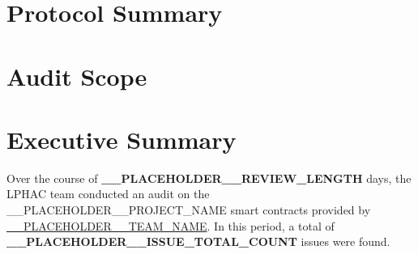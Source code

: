 \newcommand{\truncatehash}[1]{%
  \StrLeft{#1}{12}\ldots%
}

\hypertarget{protocol-summary}{%
\section{Protocol Summary}\label{protocol-summary}}



\hypertarget{audit-scope}{%
\section{Audit Scope}\label{audit-scope}}


 
\hypertarget{executive-summary}{%
\section{Executive Summary}\label{executive-summary}}

Over the course of \textbf{__PLACEHOLDER__REVIEW_LENGTH} days, the LPHAC team conducted an audit on the __PLACEHOLDER__PROJECT_NAME
smart contracts provided by
\href{__PLACEHOLDER__TEAM_WEBSITE}{__PLACEHOLDER__TEAM_NAME}.
In this period, a total of \textbf{__PLACEHOLDER__ISSUE_TOTAL_COUNT} issues were found.

\bigbreak


\vspace{1cm}

\renewcommand{\floatpagefraction}{.8}%
\renewcommand{\textfraction}{.1}%
\renewcommand{\topfraction}{.9}%
\renewcommand{\bottomfraction}{.9}%
\setcounter{topnumber}{2}
\setcounter{bottomnumber}{2}
\setcounter{totalnumber}{4}

